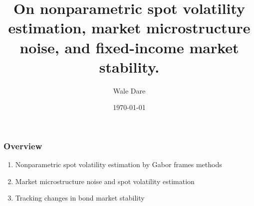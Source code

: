 \documentclass[fleqn]{beamer}
\title[Short title]{On nonparametric spot  volatility estimation, market microstructure noise, and fixed-income market stability.} %
\author{Wale Dare} %
\institute[University of St. Gallen] %
{
University of St. Gallen \\ %
\medskip
}
\date{\today} %
\begin{document}
\begin{frame}
\titlepage %
\end{frame}
\begin{frame}
\frametitle{Overview}
\begin{enumerate}
  \item Nonparametric spot volatility estimation by Gabor frames methods
  \item Market microstructure noise and spot volatility estimation
  \item Tracking changes in  bond market stability
\end{enumerate}
\tableofcontents %
\end{frame}
\end{document}
